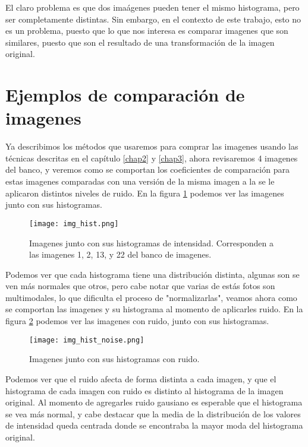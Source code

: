 El claro problema es que dos ima\'agenes pueden tener el mismo histograma, pero ser completamente distintas. Sin embargo, en el contexto de este trabajo, esto no es un problema, puesto que lo que nos interesa es comparar imagenes que son similares, puesto que son el resultado de una transformaci\'on de la imagen original.

\section{Ejemplos de comparaci\'on de imagenes}

Ya describimos los m\'etodos que usaremos para comprar las imagenes usando las t\'ecnicas descritas en el cap\'itulo \ref{chap2} y \ref{chap3}, ahora revisaremos 4 imagenes del banco, y veremos como se comportan los coeficientes de comparaci\'on para estas imagenes comparadas con una versi\'on de la misma imagen a la se le aplicaron distintos niveles de ruido. En la figura \ref{fig:img_hist} podemos ver las imagenes junto con sus histogramas.

\begin{figure}[H]
    \centering
    \texttt{[image: img\_hist.png]}
    \caption{Imagenes junto con sus histogramas de intensidad. Corresponden a las imagenes 1, 2, 13, y 22 del banco de imagenes.}
    \label{fig:img_hist}
\end{figure}

Podemos ver que cada histograma tiene una distribuci\'on distinta, algunas son se ven m\'as normales que otros, pero cabe notar que varias de est\'as fotos son multimodales, lo que dificulta el proceso de "normalizarlas", veamos ahora como se comportan las imagenes y su histograma al momento de aplicarles ruido. En la figura \ref{fig:img_hist_ruido} podemos ver las imagenes con ruido, junto con sus histogramas.

\begin{figure}[H]
    \centering
    \texttt{[image: img\_hist\_noise.png]}
    \caption{Imagenes junto con sus histogramas con ruido.}
    \label{fig:img_hist_ruido}
\end{figure}

Podemos ver que el ruido afecta de forma distinta a cada imagen, y que el histograma de cada imagen con ruido es distinto al histograma de la imagen original. Al momento de agregarles ruido gausiano es esperable que el histograma se vea más normal, y cabe destacar que la media de la distribución de los valores de intensidad queda centrada donde se encontraba la mayor moda del histograma original. 

